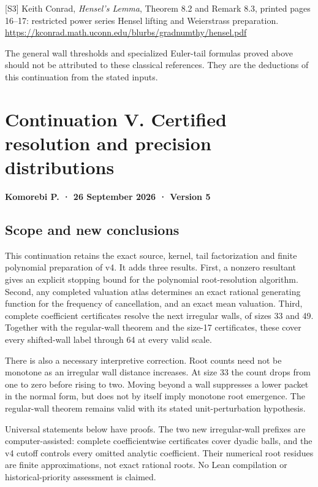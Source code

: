 \documentclass[11pt,letterpaper]{article}
\begin{document}
{[}S3{]} Keith Conrad, \emph{Hensel's Lemma}, Theorem 8.2 and Remark 8.3, printed pages 16--17: restricted power series Hensel lifting and Weierstrass preparation. \url{https://kconrad.math.uconn.edu/blurbs/gradnumthy/hensel.pdf}

The general wall thresholds and specialized Euler-tail formulas proved above should not be attributed to these classical references. They are the deductions of this continuation from the stated inputs.

\clearpage

\section{Continuation V. Certified resolution and precision distributions}\label{continuation-v.-certified-resolution-and-precision-distributions}

\textbf{Komorebi P. · 26 September 2026 · Version 5}

\subsection{Scope and new conclusions}\label{scope-and-new-conclusions}

This continuation retains the exact source, kernel, tail factorization and finite polynomial preparation of v4. It adds three results. First, a nonzero resultant gives an explicit stopping bound for the polynomial root-resolution algorithm. Second, any completed valuation atlas determines an exact rational generating function for the frequency of cancellation, and an exact mean valuation. Third, complete coefficient certificates resolve the next irregular walls, of sizes 33 and 49. Together with the regular-wall theorem and the size-17 certificates, these cover every shifted-wall label through 64 at every valid scale.

There is also a necessary interpretive correction. Root counts need not be monotone as an irregular wall distance increases. At size 33 the count drops from one to zero before rising to two. Moving beyond a wall suppresses a lower packet in the normal form, but does not by itself imply monotone root emergence. The regular-wall theorem remains valid with its stated unit-perturbation hypothesis.

Universal statements below have proofs. The two new irregular-wall prefixes are computer-assisted: complete coefficientwise certificates cover dyadic balls, and the v4 cutoff controls every omitted analytic coefficient. Their numerical root residues are finite approximations, not exact rational roots. No Lean compilation or historical-priority assessment is claimed.
\end{document}
